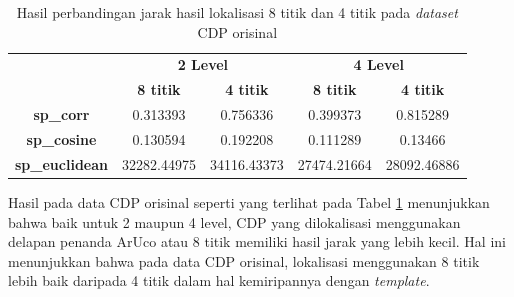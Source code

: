 \begin{table}[!ht]
	\centering
	\caption{Hasil perbandingan jarak hasil lokalisasi 8 titik dan 4 titik pada \emph{dataset} CDP orisinal}
	\vspace{0.5em}
	\begin{tabular}{|c|cc|cc|}
		\hline
		\multirow{2}{*}{}      & \multicolumn{2}{c|}{\textbf{2 Level}} & \multicolumn{2}{c|}{\textbf{4 Level}}                                                            \\ \cline{2-5}
		                       & \multicolumn{1}{c|}{\textbf{8 titik}} & \textbf{4 titik}                      & \multicolumn{1}{c|}{\textbf{8 titik}} & \textbf{4 titik} \\ \hline
		\textbf{sp\_corr}      & \multicolumn{1}{c|}{0.313393}         & 0.756336                              & \multicolumn{1}{c|}{0.399373}         & 0.815289         \\ \hline
		\textbf{sp\_cosine}    & \multicolumn{1}{c|}{0.130594}         & 0.192208                              & \multicolumn{1}{c|}{0.111289}         & 0.13466          \\ \hline
		\textbf{sp\_euclidean} & \multicolumn{1}{c|}{32282.44975}      & 34116.43373                           & \multicolumn{1}{c|}{27474.21664}      & 28092.46886      \\ \hline
	\end{tabular}
	\label{Tab: 4-jaraklokalisasiarucovsnonarucoori}
\end{table}

Hasil pada data CDP orisinal seperti yang terlihat pada Tabel \ref{Tab: 4-jaraklokalisasiarucovsnonarucoori} menunjukkan bahwa baik untuk 2 maupun 4 level, CDP
yang dilokalisasi menggunakan delapan penanda ArUco atau 8 titik memiliki hasil jarak yang lebih kecil. Hal ini menunjukkan bahwa pada data CDP orisinal,
lokalisasi menggunakan 8 titik lebih baik daripada 4 titik dalam hal kemiripannya dengan \emph{template}.

